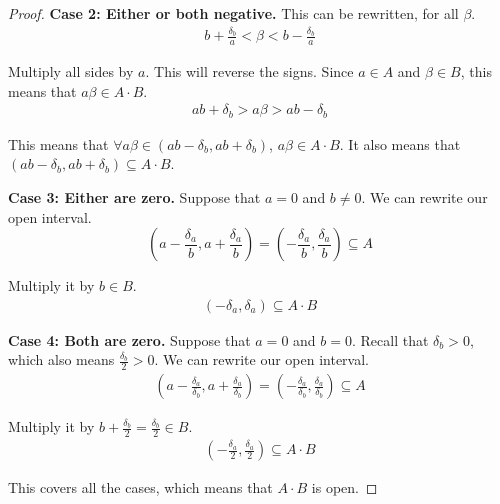 \documentclass[12pt]{report}
\newenvironment{case}[2]{\par\textbf{Case #1: #2.}}{}
\begin{document}
\begin{proof}
\begin{case}{2}{Either or both negative}
                This can be rewritten, for all $\beta$.
                \begin{gather}
                    b + \frac{\delta_b}{a} < \beta < b - \frac{\delta_b}{a}
                \end{gather}
                
                Multiply all sides by $a$.
                This will reverse the signs.
                Since $a \in A$ and $\beta \in B$, this means that $a\beta \in A \cdot B$.
                \begin{gather}
                    ab + \delta_b > a\beta > ab - \delta_b
                \end{gather}

                This means that $\forall a\beta \in \left( ab - \delta_b, ab + \delta_b \right)$, $a\beta \in A \cdot B$.
                It also means that $\left( ab - \delta_b, ab + \delta_b \right) \subseteq A \cdot B$.
            \end{case}

            \begin{case}{3}{Either are zero}
                Suppose that $a = 0$ and $b \neq 0$.
                We can rewrite our open interval.
                \begin{equation}
                    \left(a - \frac{\delta_a}{b}, a + \frac{\delta_a}{b}\right) = \left(-\frac{\delta_a}{b}, \frac{\delta_a}{b}\right) \subseteq A
                \end{equation}

                Multiply it by $b \in B$.
                \begin{gather}
                    \left(-\delta_a, \delta_a\right) \subseteq A \cdot B
                \end{gather}
            \end{case}

            \begin{case}{4}{Both are zero}
                Suppose that $a = 0$ and $b = 0$.
                Recall that $\delta_b > 0$, which also means $\frac{\delta_b}{2} > 0$.
                We can rewrite our open interval.
                \begin{gather}
                    \left(a - \frac{\delta_a}{\delta_b}, a + \frac{\delta_a}{\delta_b}\right) = \left(-\frac{\delta_a}{\delta_b}, \frac{\delta_a}{\delta_b}\right) \subseteq A
                \end{gather}

                Multiply it by $b + \frac{\delta_b}{2} = \frac{\delta_b}{2} \in B$.
                \begin{gather}
                    \left(-\frac{\delta_a}{2}, \frac{\delta_a}{2}\right) \subseteq A \cdot B
                \end{gather}
            \end{case}

            This covers all the cases, which means that $A \cdot B$ is open.
        \end{proof}
\end{document}
